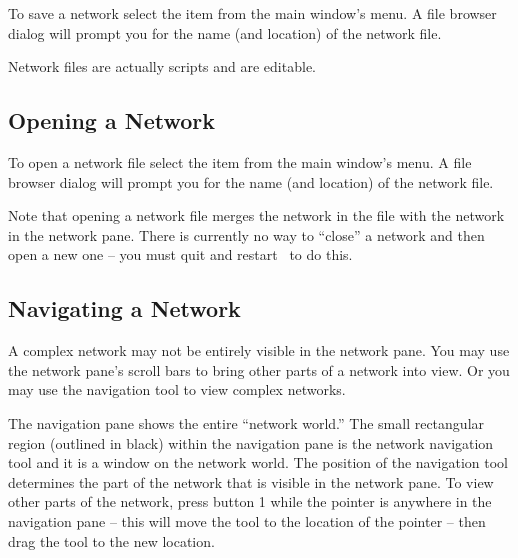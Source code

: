 To save a network select the  item from the main window's
 menu.  A file browser dialog will prompt you for the
name (and location) of the network file.

Network files are actually  scripts and
are editable.

\subsection{Opening a Network}
\label{sec:opennet}

To open a network file select the  item from the main
window's  menu.   A file browser dialog will prompt you for the
name (and location) of the network file.

Note that opening a network file merges the network in the file with the
network in the network pane.  There is currently no way to ``close'' a
network and then open a new one -- you must quit and restart \sr\ to do
this.

\subsection{Navigating a Network}
\label{sec:navnetwork}

A complex network may not be entirely visible in the network pane.  You may
use the network pane's scroll bars to bring other parts of a network into
view.  Or you may use the navigation tool to view complex networks.

The navigation pane shows the entire ``network world.''  The small
rectangular region (outlined in black) within the navigation pane is the
network navigation tool and it is a window on the network world.  The
position of the navigation tool determines the part of the network that is
visible in the network pane.  To view other parts of the network, press
button 1 while the pointer is anywhere in the navigation pane -- this will
move the tool to the location of the pointer --  then drag the tool to the
new location.



